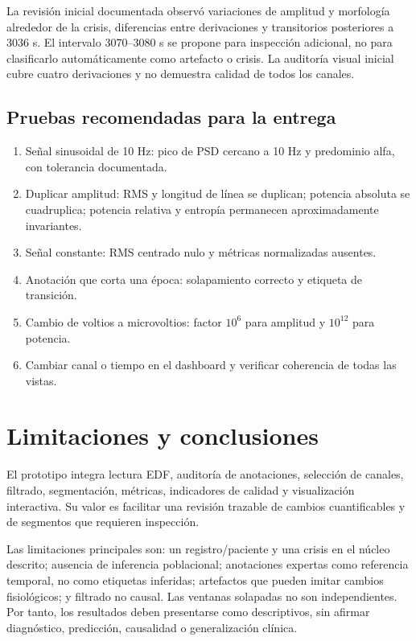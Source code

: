 \documentclass[11pt,a4paper]{article}
\begin{document}
La revisión inicial documentada observó variaciones de amplitud y morfología alrededor de la crisis, diferencias entre derivaciones y transitorios posteriores a 3036 s. El intervalo 3070--3080 s se propone para inspección adicional, no para clasificarlo automáticamente como artefacto o crisis. La auditoría visual inicial cubre cuatro derivaciones y no demuestra calidad de todos los canales.

\subsection{Pruebas recomendadas para la entrega}
\begin{enumerate}[leftmargin=*]
\item Señal sinusoidal de 10 Hz: pico de PSD cercano a 10 Hz y predominio alfa, con tolerancia documentada.
\item Duplicar amplitud: RMS y longitud de línea se duplican; potencia absoluta se cuadruplica; potencia relativa y entropía permanecen aproximadamente invariantes.
\item Señal constante: RMS centrado nulo y métricas normalizadas ausentes.
\item Anotación que corta una época: solapamiento correcto y etiqueta de transición.
\item Cambio de voltios a microvoltios: factor $10^6$ para amplitud y $10^{12}$ para potencia.
\item Cambiar canal o tiempo en el dashboard y verificar coherencia de todas las vistas.
\end{enumerate}

\section{Limitaciones y conclusiones}
El prototipo integra lectura EDF, auditoría de anotaciones, selección de canales, filtrado, segmentación, métricas, indicadores de calidad y visualización interactiva. Su valor es facilitar una revisión trazable de cambios cuantificables y de segmentos que requieren inspección.

Las limitaciones principales son: un registro/paciente y una crisis en el núcleo descrito; ausencia de inferencia poblacional; anotaciones expertas como referencia temporal, no como etiquetas inferidas; artefactos que pueden imitar cambios fisiológicos; y filtrado no causal. Las ventanas solapadas no son independientes. Por tanto, los resultados deben presentarse como descriptivos, sin afirmar diagnóstico, predicción, causalidad o generalización clínica.
\end{document}
